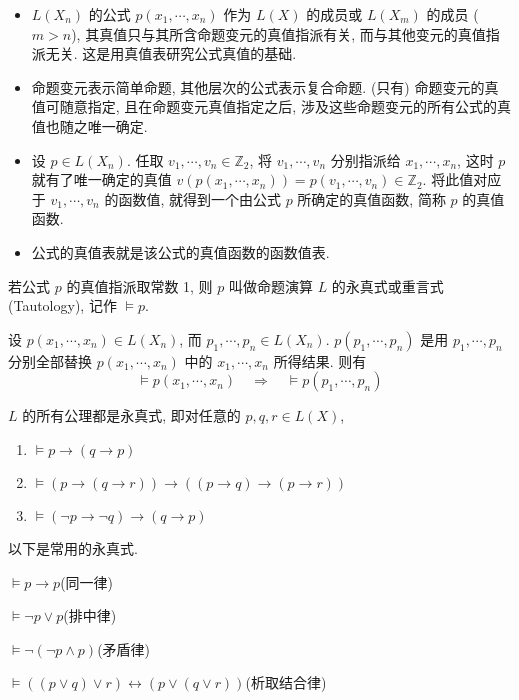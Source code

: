 \documentclass[
    mode=hazy,
    color=blue,
    device=normal,
    lang=cn
]{elegantnote}
\begin{document}
\begin{itemize}
    \item $L(X_n)$ 的公式 $p(x_1,\cdots,x_n)$ 作为 $L(X)$ 的成员或 $L(X_m)$ 的成员 ($m>n$), 其真值只与其所含命题变元的真值指派有关, 而与其他变元的真值指派无关. 这是用真值表研究公式真值的基础.
    \item 命题变元表示简单命题, 其他层次的公式表示复合命题. (只有) 命题变元的真值可随意指定, 且在命题变元真值指定之后, 涉及这些命题变元的所有公式的真值也随之唯一确定.
    \item 设 $p\in L(X_n)$. 任取 $v_1, \cdots, v_n \in\mathbb{Z}_2$, 将 $v_1, \cdots, v_n$ 分别指派给 $x_1, \cdots, x_n$, 这时 $p$ 就有了唯一确定的真值 $v(p(x_1,\cdots,x_n))=p(v_1,\cdots,v_n)\in\mathbb{Z}_2$. 将此值对应于 $v_1, \cdots, v_n$ 的函数值, 就得到一个由公式 $p$ 所确定的真值函数, 简称 $p$ 的真值函数.
    \item 公式的真值表就是该公式的真值函数的函数值表.
\end{itemize}
\begin{definition}[永真式]
    若公式 $p$ 的真值指派取常数 1, 则 $p$ 叫做命题演算 $L$ 的永真式或重言式 (Tautology), 记作 $\vDash p$.
\end{definition}
\begin{theorem}[代换定理]
    设 $p(x_1, \cdots, x_n)\in L(X_n)$, 而 $p_1, \cdots, p_n\in L(X_n)$. $p(p_1, \cdots, p_n)$ 是用 $p_1,\cdots,p_n$ 分别全部替换 $p(x_1,\cdots,x_n)$ 中的 $x_1, \cdots, x_n$ 所得结果. 则有
    $$
        \vDash p(x_1, \cdots, x_n)\quad\Rightarrow\quad \vDash p(p_1,\cdots,p_n)
    $$
\end{theorem}
\begin{proposition}
    $L$ 的所有公理都是永真式, 即对任意的 $p,q,r\in L(X)$,
    \begin{enumerate}[label = $\arabic*^\circ$, topsep = -1em]
        \item $\vDash p\to(q\to p)$
        \item $\vDash (p\to (q\to r))\to ((p\to q)\to (p\to r))$
        \item $\vDash (\lnot p\to \lnot q)\to (q\to p)$
    \end{enumerate}
\end{proposition}

以下是常用的永真式.

$\vDash p\to p$\hfill(同一律)

$\vDash \lnot p\lor p$\hfill(排中律)

$\vDash \lnot(\lnot p\land p)$\hfill(矛盾律)

$\vDash ((p\lor q)\lor r)\leftrightarrow(p\lor(q\lor r))$\hfill(析取结合律)
\end{document}
